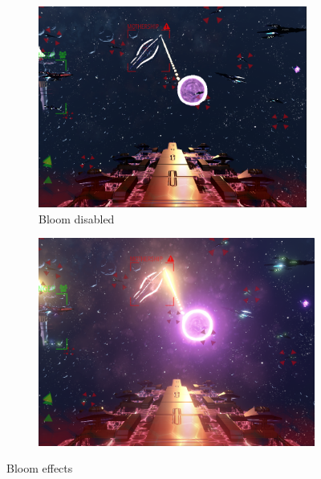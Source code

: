 \documentclass[a4paper,11pt]{article}
\begin{document}
\begin{figure}[ht]
	\centering
    
    \begin{subfigure}{.5\textwidth}
      \centering
      \includegraphics[width=0.97\textwidth]{bloomOff}
      \caption{Bloom disabled}
      \label{fig:bloomOff}
    \end{subfigure}%
    \begin{subfigure}{.5\textwidth}
    	\centering
		\includegraphics[width=.97\textwidth]{bloomOn}
        \label{fig:bloomOn}
	\end{subfigure}
	\caption{Bloom effects}
	\label{fig:bloom}
\end{figure}
\end{document}
